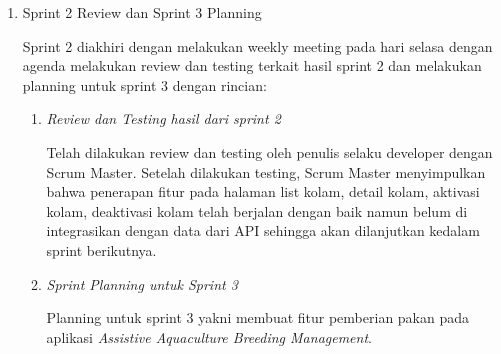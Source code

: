 \begin{enumerate}[listparindent=2em]
\item{Sprint 2 Review dan Sprint 3 Planning}

Sprint 2 diakhiri dengan melakukan weekly meeting pada hari selasa dengan agenda melakukan review dan testing terkait hasil sprint 2 dan melakukan planning untuk sprint 3 dengan rincian:
\begin{enumerate}
	\item{\textit{Review dan Testing hasil dari sprint 2}}

	Telah dilakukan review dan testing oleh penulis selaku developer dengan Scrum Master. Setelah dilakukan testing, Scrum Master menyimpulkan bahwa penerapan fitur pada halaman list kolam, detail kolam, aktivasi kolam, deaktivasi kolam telah berjalan dengan baik namun belum di integrasikan dengan data dari API sehingga akan dilanjutkan kedalam sprint berikutnya.

	\item{\textit{Sprint Planning untuk Sprint 3}}
	
	Planning untuk sprint 3 yakni membuat fitur pemberian pakan pada aplikasi \textit{Assistive Aquaculture Breeding Management}.
\end{enumerate}
\end{enumerate}